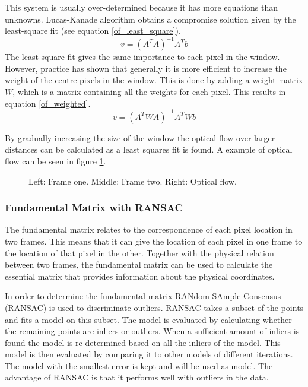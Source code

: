 \documentclass[a4paper]{article}
\begin{document}
This system is usually over-determined because it has more equations than unknowns. Lucas-Kanade algorithm obtains a compromise solution given by the least-square fit (see equation \ref{of_least_square}).
\begin{equation}
\label{of_least_square}
v = (A^T A)^{-1} A^T b
\end{equation}
The least square fit gives the same importance to each pixel in the window. However, practice has shown that generally it is more efficient to increase the weight of the centre pixels in the window. This is done by adding a weight matrix $W$, which is a matrix containing all the weights for each pixel. This results in equation \ref{of_weighted}.
\begin{equation}
\label{of_weighted}
v = (A^T W A)^{-1} A^T W b
\end{equation}

By gradually increasing the size of the window the optical flow over larger distances can be calculated as a least squares fit is found. A example of optical flow can be seen in figure \ref{opticflow}.

\begin{figure}[!ht]
\centering
\caption{Left: Frame one. Middle: Frame two. Right: Optical flow.}
\label{opticflow}
\end{figure}

\subsubsection{Fundamental Matrix with RANSAC}
The fundamental matrix relates to the correspondence of each pixel location in two frames. This means that it can give the location of each pixel in one frame to the location of that pixel in the other. Together with the physical relation between two frames, the fundamental matrix can be used to calculate the essential matrix that provides information about the physical coordinates.

In order to determine the fundamental matrix RANdom SAmple Consensus (RANSAC) is used to discriminate outliers. RANSAC takes a subset of the points and fits a model on this subset. The model is evaluated by calculating whether the remaining points are inliers or outliers. When a sufficient amount of inliers is found the model is re-determined based on all the inliers of the model. This model is then evaluated by comparing it to other models of different iterations. The model with the smallest error is kept and will be used as model. The advantage of RANSAC is that it performs well with outliers in the data.
\end{document}
